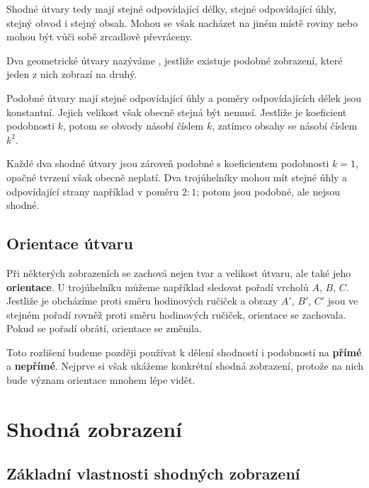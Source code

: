 \documentclass[12pt,a4paper]{article}
\begin{document}
Shodné útvary tedy mají stejné odpovídající délky, stejné odpovídající úhly, stejný obvod i stejný obsah. Mohou se však nacházet na jiném místě roviny nebo mohou být vůči sobě zrcadlově převráceny.

\begin{definitionbox}
    Dva geometrické útvary nazýváme , jestliže existuje podobné zobrazení, které jeden z nich zobrazí na druhý.
\end{definitionbox}

Podobné útvary mají stejné odpovídající úhly a poměry odpovídajících délek jsou konstantní. Jejich velikost však obecně stejná být nemusí. Jestliže je koeficient podobnosti $k$, potom se obvody násobí číslem $k$, zatímco obsahy se násobí číslem $k^2$.

\begin{notebox}
    Každé dva shodné útvary jsou zároveň podobné s koeficientem podobnosti $k=1$, opačné tvrzení však obecně neplatí. Dva trojúhelníky mohou mít stejné úhly a odpovídající strany například v poměru $2:1$; potom jsou podobné, ale nejsou shodné.
\end{notebox}

\subsection{Orientace útvaru}

Při některých zobrazeních se zachová nejen tvar a velikost útvaru, ale také jeho \textbf{orientace}. U trojúhelníku můžeme například sledovat pořadí vrcholů $A$, $B$, $C$. Jestliže je obcházíme proti směru hodinových ručiček a obrazy $A'$, $B'$, $C'$ jsou ve stejném pořadí rovněž proti směru hodinových ručiček, orientace se zachovala. Pokud se pořadí obrátí, orientace se změnila.

Toto rozlišení budeme později používat k dělení shodností i podobností na \textbf{přímé} a \textbf{nepřímé}. Nejprve si však ukážeme konkrétní shodná zobrazení, protože na nich bude význam orientace mnohem lépe vidět.



\section{Shodná zobrazení}

\subsection{Základní vlastnosti shodných zobrazení}
\end{document}
